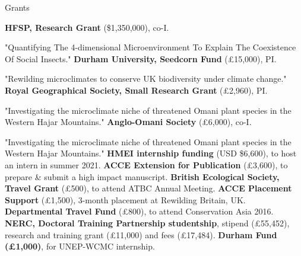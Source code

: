 \begin{rubric}{Grants}

\entry*[2023] \textbf{HFSP, Research Grant} (\$1,350,000), co-I.
	\par \footnotesize "Quantifying The 4-dimensional Microenvironment To Explain The Coexistence Of Social Insects." \normalsize
\entry*[2023] \textbf{Durham University, Seedcorn Fund} (£15,000), PI.
	\par \footnotesize "Rewilding microclimates to conserve UK biodiversity under climate change." \normalsize
\entry*[2022] \textbf{Royal Geographical Society, Small Research Grant} (£2,960), PI.
	\par \footnotesize "Investigating the microclimate niche of threatened Omani plant species in the Western Hajar Mountains." \normalsize
\entry*[2022] \textbf{Anglo-Omani Society} (£6,000), co-I.
	\par \footnotesize "Investigating the microclimate niche of threatened Omani plant species in the Western Hajar Mountains." \normalsize
\entry*[2021] \textbf{HMEI internship funding} (USD \$6,600), to host an intern in summer 2021.
\entry*[2018] \textbf{ACCE Extension for Publication} (£3,600), to prepare \& submit a high impact manuscript.
\entry*[2018] \textbf{British Ecological Society, Travel Grant} (£500), to attend ATBC Annual Meeting.
\entry*[2016] \textbf{ACCE Placement Support} (£1,500), 3-month placement at Rewilding Britain, UK.
\entry*[2016] \textbf{Departmental Travel Fund} (£800), to attend Conservation Asia 2016.
\entry*[2014] \textbf{NERC, Doctoral Training Partnership studentship}, stipend (£55,452), research and training grant (£11,000) and fees (£17,484).
\entry*[2013] \textbf{Durham Fund (£1,000)}, for UNEP-WCMC internship.

%



\end{rubric}
